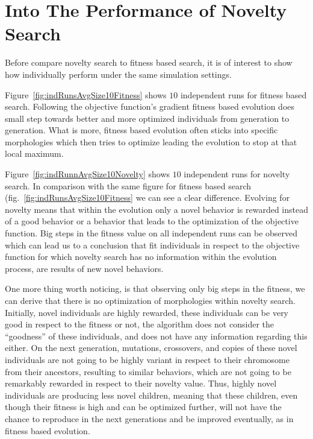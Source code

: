 \section{Into The Performance of Novelty Search}

Before compare novelty search to fitness based search, it is of interest to show how individually perform under the same simulation settings.

Figure~\ref{fig:indRunsAvgSize10Fitness} shows $10$ independent runs for fitness based search. Following the objective function's gradient fitness based evolution does small step towards better and more optimized individuals from generation to generation. What is more, fitness based evolution often sticks into specific morphologies which then tries to optimize leading the evolution to stop at that local maximum.

Figure~\ref{fig:indRunnAvgSize10Novelty} shows $10$ independent runs for novelty  search. In comparison with the same figure for fitness based search (fig.~\ref{fig:indRunsAvgSize10Fitness} we can see a clear difference. Evolving for novelty means that within the evolution only a novel behavior is rewarded instead of a good behavior or a behavior that leads to the optimization of the objective function. Big steps in the fitness value on all independent runs can be observed which can lead us to a conclusion that fit individuals in respect to the objective function for which novelty search has no information within the evolution process, are results of new novel behaviors. 

One more thing worth noticing, is that observing only big steps in the fitness, we can derive that there is no optimization of morphologies within novelty search. Initially, novel individuals are highly rewarded, these individuals can be very good in respect to the fitness or not, the algorithm does not consider the ``goodness'' of these individuals, and does not have any information regarding this either. On the next generation, mutations, crossovers, and copies of these novel individuals are not going to be highly variant in respect to their chromosome from their ancestors, resulting to similar behaviors, which are  not going to be remarkably rewarded in respect to their novelty value. Thus, highly novel individuals are producing less novel children, meaning that these children, even though their fitness is high and can be optimized further, will not have the chance to reproduce in the next generations and be improved eventually, as in fitness based evolution.

